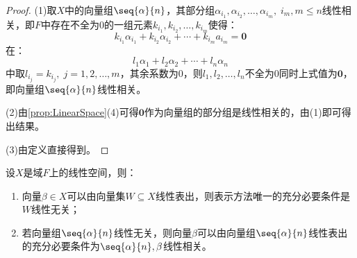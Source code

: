 \begin{proof}
	(1)取$X$中的向量组$\seq{\alpha}{n}$，其部分组$\alpha_{i_1},\alpha_{i_2},\dots,\alpha_{i_m},\;i_m,m\leqslant n$线性相关，即$F$中存在不全为$0$的一组元素$k_{i_1},k_{i_2},\dots,k_{i_m}$使得：
	\begin{equation*}
		k_{i_1}\alpha_{i_1}+k_{i_2}\alpha_{i_2}+\cdots+k_{i_m}a_{i_m}=\mathbf{0}
	\end{equation*}
	在：
	\begin{equation*}
		l_1\alpha_1+l_2\alpha_2+\cdots+l_n\alpha_n
	\end{equation*}
	中取$l_{i_j}=k_{i_j},\;j=1,2,\dots,m$，其余系数为$0$，则$l_1,l_2,\dots,l_n$不全为$0$同时上式值为$\mathbf{0}$，即向量组$\seq{\alpha}{n}$线性相关。\par
	(2)由\cref{prop:LinearSpace}(4)可得$\mathbf{0}$作为向量组的部分组是线性相关的，由(1)即可得出结果。\par
	(3)由定义直接得到。
\end{proof}
\begin{property}\label{prop:LinearlyRepresentation}
	设$X$是域$F$上的线性空间，则：
	\begin{enumerate}
		\item 向量$\beta\in X$可以由向量集$W\subseteq X$线性表出，则表示方法唯一的充分必要条件是$W$线性无关；
		\item 若向量组$\seq{\alpha}{n}$线性无关，则向量$\beta$可以由向量组$\seq{\alpha}{n}$线性表出的充分必要条件为$\seq{\alpha}{n},\beta$线性相关。
	\end{enumerate}
\end{property}
